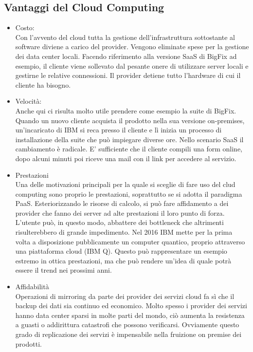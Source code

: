 \subsection{Vantaggi del Cloud Computing}
\begin{itemize}
	\item Costo: \\
	Con l'avvento del cloud tutta la gestione dell'infrastruttura sottostante al software diviene a carico del provider. Vengono eliminate spese per la gestione dei data center locali. Facendo riferimento alla versione SaaS di BigFix ad esempio, il cliente viene sollevato dal pesante onere di utilizzare server locali e gestirne le relative connessioni. Il provider detiene tutto l'hardware di cui il cliente ha bisogno.
	
	\item Velocità: \\
	Anche qui ci risulta molto utile prendere come esempio la suite di BigFix. Quando un nuovo cliente acquista il prodotto nella sua versione on-premises, un'incaricato di IBM si reca presso il cliente e lì inizia un processo di installazione della suite che può impiegare diverse ore. Nello scenario SaaS il cambiamento è radicale. E' sufficiente che il cliente compili una form online, dopo alcuni minuti poi riceve una mail con il link per accedere al servizio.
	
	\item Prestazioni \\
	Una delle motivazioni principali per la quale si sceglie di fare uso del clud computing sono proprio le prestazioni, soprattutto se si adotta il paradigma PaaS. Esteriorizzando le risorse di calcolo, si può fare affidamento a dei provider che fanno dei server ad alte prestazioni il loro punto di forza. L'utente può, in questo modo, abbattere dei bottleneck che altrimenti risulterebbero di grande impedimento. Nel 2016 IBM mette per la prima volta a disposizione pubblicamente un computer quantico, proprio attraverso una piattaforma cloud (IBM Q). Questo può rappresentare un esempio estremo in ottica prestazioni, ma che può rendere un'idea di quale potrà essere il trend nei prossimi anni.
	
	\item Affidabilità \\
	Operazioni di mirroring da parte dei provider dei servizi cloud fa sì che il backup dei dati sia continuo ed economico. Molto spesso i provider dei servizi hanno data center sparsi in molte parti del mondo, ciò aumenta la resistenza a guasti o addirittura catastrofi che possono verificarsi. Ovviamente questo grado di replicazione dei servizi è impensabile nella fruizione on premise dei prodotti.
\end{itemize}

